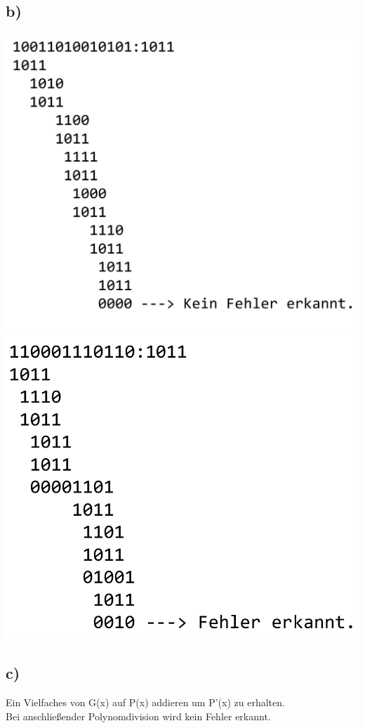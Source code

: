 \documentclass{article}
\begin{document}
	\subsection*{b)}
	\includegraphics[width=\linewidth]{123b1} \\
	\includegraphics[width=\linewidth]{123b2}
	\subsection*{c)}
	Ein Vielfaches von G(x) auf P(x) addieren um P'(x) zu erhalten. \\
	Bei anschließender Polynomdivision wird kein Fehler erkannt.
	
\end{document}
